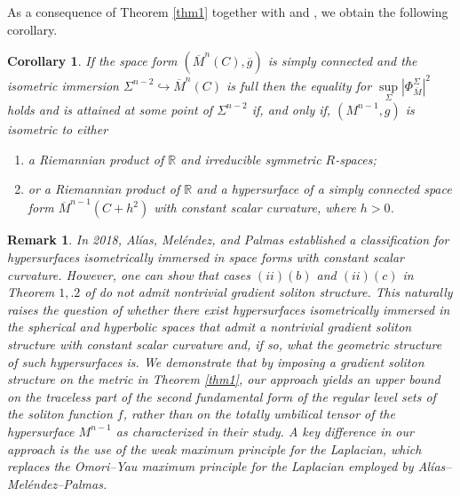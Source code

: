 \documentclass[11pt]{amsart}
\newtheorem{corollary}[theorem]{Corollary}
\newtheorem{remark}[theorem]{Remark}
\numberwithin{equation}{section}
\begin{document}
As a consequence of Theorem \ref{thm1} together with \cite{CSY} and \cite{Takeuchi1981}, we obtain the following corollary.
\begin{corollary}
    If the space form $\left(\overline{M}^n(C), \overline{g}\right)$ is simply connected and the isometric immersion $ \Sigma^{n-2}\hookrightarrow \overline{M}^n(C)$ is full then the equality for $\sup\limits_{\Sigma}\left|\Phi^{\Sigma}_{\overline{M}}\right|^2$ holds and is attained at some point of $\Sigma^{n-2}$ if, and only if, $\left(M^{n-1}, g\right)$ is isometric to either
    \begin{enumerate}
        \item a Riemannian product of $\mathbb{R}$ and irreducible symmetric $R$-spaces;
        \item or a Riemannian product of $\mathbb{R}$ and a hypersurface of a simply connected space form $\overline{M}^{n-1}\left(C+h^2\right)$ with constant scalar curvature, where $h>0$. 
    \end{enumerate}
    
\end{corollary}
    

    


\begin{remark}
   In 2018, Alías, Meléndez, and Palmas \cite{AMP} established a classification for hypersurfaces isometrically immersed in space forms with constant scalar curvature. However, one can show that cases $(ii)(b)$ and $(ii)(c)$ in Theorem $1,.2$ of \cite{AMP} do not admit nontrivial gradient soliton structure. This naturally raises the question of whether there exist hypersurfaces isometrically immersed in the spherical and hyperbolic spaces that admit a nontrivial gradient soliton structure with constant scalar curvature and, if so, what the geometric structure of such hypersurfaces is. We demonstrate that by imposing a gradient soliton structure on the metric in Theorem \ref{thm1}, our approach yields an upper bound on the traceless part of the second fundamental form of the regular level sets of the soliton function $f$, rather than on the totally umbilical tensor of the hypersurface $M^{n-1}$ as characterized in their study. A key difference in our approach is the use of the weak maximum principle for the Laplacian, which replaces the Omori–Yau maximum principle for the Laplacian employed by Alías–Meléndez–Palmas.
\end{remark}
\end{document}
